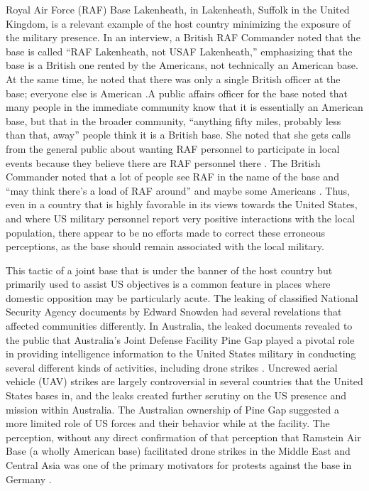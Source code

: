 {	Royal Air Force (RAF) Base Lakenheath, in Lakenheath, Suffolk in the United Kingdom, is a relevant example of the host country minimizing the exposure of the military presence.  In an interview, a British RAF Commander noted that the base is called ``RAF Lakenheath, not USAF Lakenheath,'' emphasizing that the base is a British one rented by the Americans, not technically an American base.  At the same time, he noted that there was only a single British officer at the base; everyone else is American \cite{rafthree20190719}.A public affairs officer for the base noted that many people in the immediate community know that it is essentially an American base, but that in the broader community, ``anything fifty miles, probably less than that, away'' people think it is a British base.  She noted that she gets calls from the general public about wanting RAF personnel to participate in local events because they believe there are RAF personnel there \cite{raftwo20190719}. The British Commander noted that a lot of people see RAF in the name of the base and ``may think there's a load of RAF around'' and maybe some Americans \cite{rafthree20190719}. Thus, even in a country that is highly favorable in its views towards the United States, and where US military personnel report very positive interactions with the local population, there appear to be no efforts made to correct these erroneous perceptions, as the base should remain associated with the local military.
	
	This tactic of a joint base that is under the banner of the host country but primarily used to assist US objectives is a common feature in places where domestic opposition may be particularly acute. The leaking of classified National Security Agency documents by Edward Snowden had several revelations that affected communities differently. In Australia, the leaked documents revealed to the public that Australia's Joint Defense Facility Pine Gap played a pivotal role in providing intelligence information to the United States military in conducting several different kinds of activities, including drone strikes \cite{Cronau2017}. Uncrewed aerial vehicle (UAV) strikes are largely controversial in several countries that the United States bases in, and the leaks created further scrutiny on the US presence and mission within Australia. The Australian ownership of Pine Gap suggested a more limited role of US forces and their behavior while at the facility. The perception, without any direct confirmation of that perception that Ramstein Air Base (a wholly American base) facilitated drone strikes in the Middle East and Central Asia was one of the primary motivators for protests against the base in Germany \cite{berlinone20190723}.
	
}
